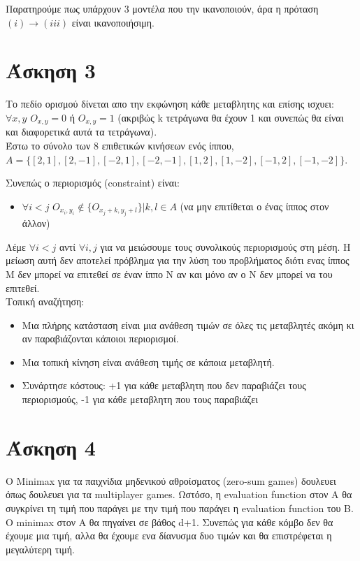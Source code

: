 \documentclass[12pt]{article}
\begin{document}
	\noindent 
	Παρατηρούμε πως υπάρχουν 3 μοντέλα που την ικανοποιούν, άρα η πρόταση $(i) \rightarrow (iii)$ είναι ικανοποιήσιμη.
	
	\section*{Άσκηση 3}
	Το πεδίο ορισμού δίνεται απο την εκφώνηση κάθε μεταβλητης και επίσης ισχυει: $\forall x,y$ $ O_{x,y} = 0 $ ή $ O_{x,y} = 1$ (ακριβώς \textlatin{k} τετράγωνα θα έχουν 1 και συνεπώς θα είναι και διαφορετικά αυτά τα τετράγωνα).\\
	Έστω \textlatin{} το σύνολο των 8 επιθετικών κινήσεων ενός ίππου,\\
	$A=\{\left[2,1\right],\left[2,-1\right],\left[-2,1\right],\left[-2,-1\right],\left[1,2\right],\left[1,-2\right],\left[-1,2\right],\left[-1,-2\right]\}$.
	
	\noindent
	Συνεπώς ο περιορισμός (\textlatin{constraint}) είναι:
	\begin{itemize}
		\item $\forall i<j$ $O_{x_i,y_i}\notin \{O_{x_j+k,y_j+l}\} | k,l \in A$ (να μην επιτίθεται ο ένας ίππος στον άλλον)
	\end{itemize}
	\noindent
	Λέμε $\forall i<j$  αντί $\forall i,j$  για να μειώσουμε τους συνολικούς περιορισμούς στη μέση. Η μείωση αυτή δεν αποτελεί πρόβλημα για την λύση του προβλήματος διότι ενας ίππος \textlatin{M} δεν μπορεί να επιτεθεί σε έναν ίππο Ν αν και μόνο αν ο Ν δεν μπορεί να του επιτεθεί.\\
	
	
	\noindent
	Τοπική αναζήτηση:
	\begin{itemize}
		\item Μια πλήρης κατάσταση είναι μια ανάθεση τιμών σε όλες τις μεταβλητές ακόμη κι αν παραβιάζονται κάποιοι περιορισμοί.
		\item Μια τοπική κίνηση είναι ανάθεση τιμής σε κάποια μεταβλητή.
		\item Συνάρτησε κόστους: +1 για κάθε μεταβλητη που δεν παραβιάζει τους περιορισμούς, -1 για κάθε μεταβλητη που τους παραβιάζει
	\end{itemize}
	\section*{Άσκηση 4}
	Ο \textlatin{Minimax} για τα παιχνίδια μηδενικού αθροίσματος (\textlatin{zero-sum games}) δουλευει όπως δουλευει για τα \textlatin{multiplayer games}. Ωστόσο, η \textlatin{evaluation function} στον Α θα συγκρίνει τη τιμή που παράγει με την τιμή που παράγει η \textlatin{evaluation function} του Β. Ο \textlatin{minimax} στον Α θα πηγαίνει σε βάθος \textlatin{d+1}. Συνεπώς για κάθε κόμβο δεν θα έχουμε μια τιμή, αλλα θα έχουμε ενα δίανυσμα δυο τιμών και θα επιστρέφεται η μεγαλύτερη τιμή.\\
	
\end{document}
